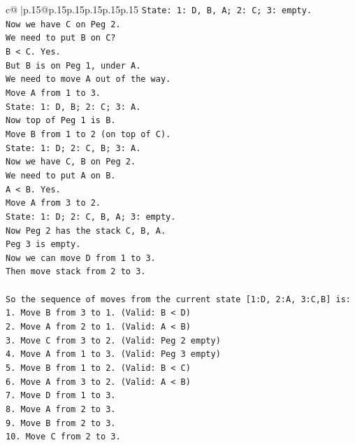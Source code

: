 \documentclass{article}
\begin{document}
{\begin{supertabular}{c@{$\;$}|p{.15\linewidth}@{}p{.15\linewidth}p{.15\linewidth}p{.15\linewidth}p{.15\linewidth}p{.15\linewidth}}
{{{\texttt{State: 1: D, B, A; 2: C; 3: empty.} \\
\texttt{Now we have C on Peg 2.} \\
\texttt{We need to put B on C?} \\
\texttt{B < C. Yes.} \\
\texttt{But B is on Peg 1, under A.} \\
\texttt{We need to move A out of the way.} \\
\texttt{Move A from 1 to 3.} \\
\texttt{State: 1: D, B; 2: C; 3: A.} \\
\texttt{Now top of Peg 1 is B.} \\
\texttt{Move B from 1 to 2 (on top of C).} \\
\texttt{State: 1: D; 2: C, B; 3: A.} \\
\texttt{Now we have C, B on Peg 2.} \\
\texttt{We need to put A on B.} \\
\texttt{A < B. Yes.} \\
\texttt{Move A from 3 to 2.} \\
\texttt{State: 1: D; 2: C, B, A; 3: empty.} \\
\texttt{Now Peg 2 has the stack C, B, A.} \\
\texttt{Peg 3 is empty.} \\
\texttt{Now we can move D from 1 to 3.} \\
\texttt{Then move stack from 2 to 3.} \\
\\ 
\texttt{So the sequence of moves from the current state {[}1:D, 2:A, 3:C,B{]} is:} \\
\texttt{1. Move B from 3 to 1. (Valid: B < D)} \\
\texttt{2. Move A from 2 to 1. (Valid: A < B)} \\
\texttt{3. Move C from 3 to 2. (Valid: Peg 2 empty)} \\
\texttt{4. Move A from 1 to 3. (Valid: Peg 3 empty)} \\
\texttt{5. Move B from 1 to 2. (Valid: B < C)} \\
\texttt{6. Move A from 3 to 2. (Valid: A < B)} \\
\texttt{7. Move D from 1 to 3.} \\
\texttt{8. Move A from 2 to 3.} \\
\texttt{9. Move B from 2 to 3.} \\
\texttt{10. Move C from 2 to 3.} \\
\\ 
}}}
\end{supertabular}}
\end{document}
